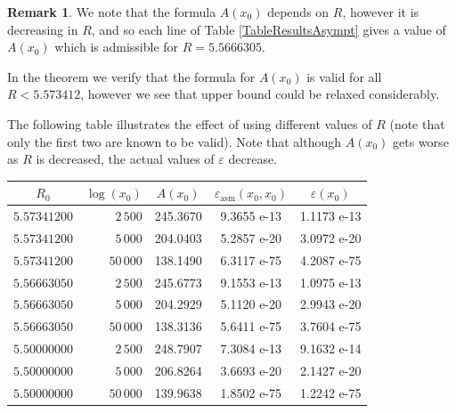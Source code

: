 \documentclass[10pt]{amsart}
\theoremstyle{definition}
\newtheorem{Rem}[prop]{Remark}
\numberwithin{equation}{section}
\begin{document}
\begin{Rem}
We note that the formula $A(x_0)$ depends on $R$, however it is decreasing in $R$, and so each line of Table \ref{TableResultsAsympt} gives a value of $A(x_0)$ which is admissible for  $R = 5.5666305$.

In the theorem we verify that the formula for $A(x_0)$ is valid for all $R<5.573412$, however we see that upper bound could be relaxed considerably.

 The following table illustrates the effect of using different values of $R$ (note that only the first two are known to be valid).
Note that although $A(x_0)$ gets worse as $R$ is decreased, the actual values of $\varepsilon$ decrease.
\begin{center}%
\begin{tabular}{|c|r|c|c|c|}
\hline
$R_0$ & $\log(x_0)$ & $A(x_0)$ & $\varepsilon_{\text{asm}}(x_0,x_0)$ & $\varepsilon(x_0)$ \\
\hline
$5.57341200$ & $2\,500$ &  245.3670 & 9.3655 e-13 & 1.1173 e-13 \\
$5.57341200$ & $5\,000$ &  204.0403 & 5.2857 e-20 & 3.0972 e-20 \\
$5.57341200$ & $50\,000$ &  138.1490 & 6.3117 e-75 & 4.2087 e-75 \\
\hline
$5.56663050$ & $2\,500$ &  245.6773 & 9.1553 e-13 & 1.0975 e-13 \\
$5.56663050$ & $5\,000$ &  204.2929 & 5.1120 e-20 & 2.9943 e-20 \\
$5.56663050$ & $50\,000$ &  138.3136 & 5.6411 e-75 & 3.7604 e-75 \\
\hline
$5.50000000$ & $2\,500$ &  248.7907 & 7.3084 e-13 & 9.1632 e-14 \\
$5.50000000$ & $5\,000$ &  206.8264 & 3.6693 e-20 & 2.1427 e-20 \\
$5.50000000$ & $50\,000$ &  139.9638 & 1.8502 e-75 & 1.2242 e-75 \\

\end{tabular}
\end{center}
\end{Rem}
\end{document}
